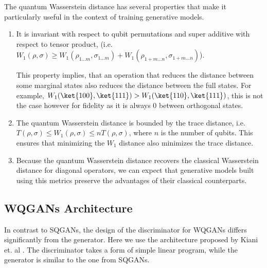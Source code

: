 The quantum Wasserstein distance has several properties that make it
particularly useful in the context of training generative models.
\begin{enumerate}
\item It is invariant with respect to qubit permutations and super additive with
  respect to tensor product, (i.e. $W_1(\rho, \sigma) \geq W_1(\rho_{1 \ldots m},
  \sigma_{1 \ldots m}) + W_1(\rho_{1+m \ldots n},
  \sigma_{1+m \ldots n})$). 

  This property implies, that an operation that reduces the distance between some
  marginal states also reduces the distance between the full states. For example,
  $W_1(\ket{100}, \ket{111}) > W_1(\ket{110}, \ket{111})$, this is not the case
  however for fidelity as it is always $0$
  between orthogonal states. 
\item The quantum Wasserstein distance is bounded by the trace distance, i.e.
  $T(\rho, \sigma) \leq W_1(\rho, \sigma) \leq nT(\rho, \sigma)$, where $n$ is
  the number of qubits. This ensures that minimizing the $W_1$ distance also
  minimizes the trace distance.
\item Because the quantum Wasserstein distance recovers the classical Wasserstein
  distance for diagonal operators, we can expect that generative models built
  using this metrics preserve the advantages of their classical counterparts.
\end{enumerate}

\subsection{WQGANs Architecture}
In contrast to SQGANs, the design of the discriminator for WQGANs
differs significantly from the generator. Here we use the architecture proposed by Kiani et. al
\cite{kiani2021quantum}. The discriminator takes a form of simple linear
program, while the generator is similar to the one from SQGANs.

